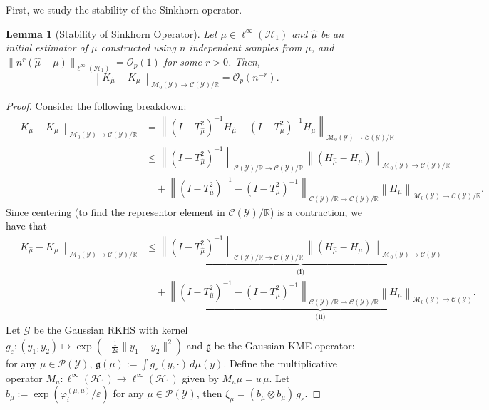 \documentclass{article}
\theoremstyle{plain}
\newtheorem{lemma}[theorem]{Lemma}
\theoremstyle{definition}
\theoremstyle{remark}
\newcommand{\R}{\mathbb{R}}
\newcommand{\cH}{\mathcal{H}}
\newcommand{\cP}{\mathcal{P}}
\newcommand{\cG}{\mathcal{G}}
\newcommand{\cC}{\mathcal{C}}
\newcommand{\cO}{\mathcal{O}}
\newcommand{\cM}{\mathcal{M}}
\newcommand{\cY}{\mathcal{Y}}
\newcommand{\1}{\mathbbm{1}}
\newcommand{\eps}{\varepsilon}
\newcommand{\norm}[1]{\left \| #1 \right \|}
\theoremstyle{plain}
\theoremstyle{definition}
\begin{document}
First, we study the stability of the Sinkhorn operator. 
\begin{lemma}[Stability of Sinkhorn Operator]\label{lem:sinkhorn_operator_stability}
    Let $\mu \in \ell^{\infty}(\cH_1)$ and $\hat{\mu}$ be an initial estimator of $\mu$ constructed using $n$ independent samples from $\mu$, and $\|n^r(\hat{\mu} - \mu)\|_{\ell^\infty(\cH_1)} = \cO_p(1)$ for some $r > 0$. Then,
    \[
    \norm{K_{\hat{\mu}} - K_\mu}_{\cM_0(\cY) \to {\cC(\cY) / \R}} = \cO_p(n^{-r}).
    \]
\end{lemma}
\begin{proof}

Consider the following breakdown:
    \begin{align*}
        \norm{K_{\hat{\mu}} - K_\mu}_{\cM_0(\cY) \to \cC(\cY) / \R} &= \norm{(I - T_{\hat{\mu}}^2)^{-1} H_{\hat{\mu}} - (I - T_\mu^2)^{-1} H_\mu}_{\cM_0(\cY) \to \cC(\cY) / \R}\\
        &\le \norm{(I - T_{\hat{\mu}}^2)^{-1}}_{\cC(\cY) / \R \to \cC(\cY) / \R}\,\norm{(H_{\hat{\mu}} - H_\mu)}_{\cM_0(\cY) \to \cC(\cY) / \R}\\
        & \quad + \norm{(I - T_{\hat{\mu}}^2)^{-1} - (I - T_{{\mu}}^2)^{-1}}_{\cC(\cY) / \R \to \cC(\cY) / \R} \norm{H_\mu}_{\cM_0(\cY) \to \cC(\cY) / \R}.
    \end{align*}
    Since centering (to find the representor element in $\cC(\cY) / \R$) is a contraction, we have that
    \begin{align*}
        \norm{K_{\hat{\mu}} - K_\mu}_{\cM_0(\cY) \to \cC(\cY) / \R} &\leq \underbrace{\norm{(I - T_{\hat{\mu}}^2)^{-1}}_{\cC(\cY) / \R \to \cC(\cY) / \R}\,\norm{(H_{\hat{\mu}} - H_\mu)}_{\cM_0(\cY)  \to \cC(\cY)}}_{\textbf{(i)}}\\
        & \quad + \underbrace{\norm{(I - T_{\hat{\mu}}^2)^{-1} - (I - T_{{\mu}}^2)^{-1}}_{\cC(\cY) / \R \to \cC(\cY) / \R} \norm{H_\mu}_{\cM_0(\cY)  \to \cC(\cY)}}_{\textbf{(ii)}}.
    \end{align*}
    Let $\cG$ be the Gaussian RKHS with kernel $g_\eps: (y_1,y_2) \mapsto \exp(- \tfrac{1}{2\eps}\|y_1 - y_2 \|^2)$ and $\mathfrak{g}$ be the Gaussian KME operator: for any $\mu \in \cP(\cY)$, $\mathfrak{g}(\mu) := \int g_\eps(y, \cdot) \, d\mu(y)$. Define the multiplicative operator $M_u: \ell^\infty(\cH_1) \to \ell^\infty(\cH_1)$ given by $M_u \mu = u \,\mu$. Let $b_\mu := \exp(\varphi_i^{(\mu, \mu)} / \eps)$ for any $\mu \in \cP(\cY)$, then $\xi_\mu = (b_\mu \otimes b_\mu) \, g_\eps$.
    

\end{proof}
\end{document}
